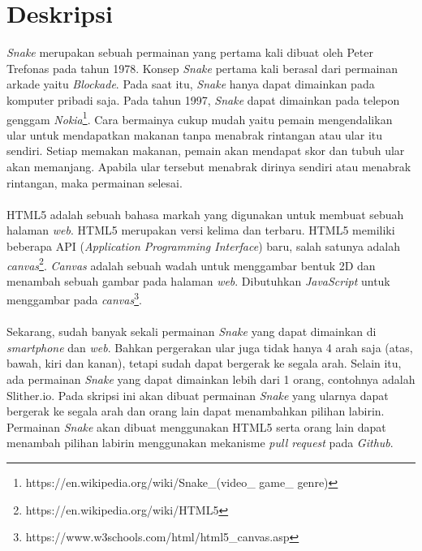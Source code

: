 \documentclass[a4paper,twoside]{article}
\begin{document}
\title{\@judultopik}
\author{\nama \textendash \@npm} 

\newcommand{\nama}{Evelyn Wijaya}
\newcommand{\@npm}{2015730030}
\newcommand{\@judultopik}{Open Source Snake 360} %
\newcommand{\jumpemb}{1} %
\newcommand{\tanggal}{07/09/2018}


\maketitle


\section{Deskripsi}
\textit{Snake} merupakan sebuah permainan yang pertama kali dibuat oleh Peter Trefonas pada tahun 1978. Konsep \textit{Snake} pertama kali berasal dari permainan arkade yaitu \textit{Blockade}. Pada saat itu, \textit{Snake} hanya dapat dimainkan pada komputer pribadi saja. Pada tahun 1997, \textit{Snake} dapat dimainkan pada telepon genggam \textit{Nokia}\footnote{https://en.wikipedia.org/wiki/Snake\_(video\_ game\_ genre)}. Cara bermainya cukup mudah yaitu pemain mengendalikan ular untuk mendapatkan makanan tanpa menabrak rintangan atau ular itu sendiri. Setiap memakan makanan, pemain akan mendapat skor dan tubuh ular akan memanjang. Apabila ular tersebut menabrak dirinya sendiri atau menabrak rintangan, maka permainan selesai.\\\\
HTML5 adalah sebuah bahasa markah yang digunakan untuk membuat sebuah halaman \textit{web}. HTML5 merupakan versi kelima dan terbaru. HTML5 memiliki beberapa API (\textit{Application Programming Interface}) baru, salah satunya adalah \textit{canvas}\footnote{https://en.wikipedia.org/wiki/HTML5}. \textit{Canvas} adalah sebuah wadah untuk menggambar bentuk 2D dan menambah sebuah gambar pada halaman \textit{web}. Dibutuhkan \textit{JavaScript} untuk menggambar pada \textit{canvas}\footnote{https://www.w3schools.com/html/html5\_canvas.asp}.\\\\
Sekarang, sudah banyak sekali permainan \textit{Snake} yang dapat dimainkan di \textit{smartphone} dan \textit{web}. Bahkan pergerakan ular juga tidak hanya 4 arah saja (atas, bawah, kiri dan kanan), tetapi sudah dapat bergerak ke segala arah. Selain itu, ada permainan \textit{Snake} yang dapat dimainkan lebih dari 1 orang, contohnya adalah Slither.io. Pada skripsi ini akan dibuat permainan \textit{Snake} yang ularnya dapat bergerak ke segala arah dan orang lain dapat menambahkan pilihan labirin. Permainan \textit{Snake} akan dibuat menggunakan HTML5 serta orang lain dapat menambah pilihan labirin menggunakan mekanisme \textit{pull request} pada \textit{Github}.
\end{document}

